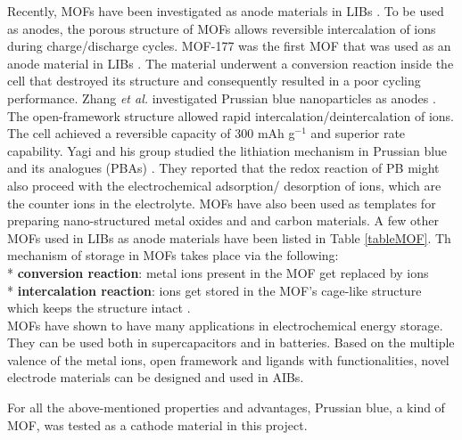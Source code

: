 Recently, MOFs have been investigated as anode materials in LIBs \cite{li_shape-controlled_2006,han_synthesis_2012,zhao_metalorganic_2015}. To be used as anodes, the porous structure of MOFs allows reversible intercalation of  ions during charge/discharge cycles. MOF-177 was the first MOF that was used as an anode material in LIBs \cite{}. The material underwent a conversion reaction inside the cell that destroyed its structure and consequently resulted in a poor cycling performance.  Zhang \textit{et al.} investigated Prussian blue nanoparticles as anodes \cite{nie}. The open-framework structure allowed rapid intercalation/deintercalation of  ions. The cell achieved a reversible capacity of 300 mAh g$^{-1}$ and superior rate capability. Yagi and his group studied the lithiation mechanism in Prussian blue and its analogues (PBAs) \cite{yagi}. They reported that the redox reaction of PB might also proceed with the electrochemical adsorption/ desorption of  ions, which are the counter ions in the electrolyte. MOFs have also been used as templates for preparing nano-structured metal oxides and and carbon materials. A few other MOFs used in LIBs as anode materials have been listed in Table \ref{tableMOF}. Th mechanism of  storage in MOFs takes place via the following: \\*
\textbf{conversion reaction}: metal ions present in the MOF get replaced by  ions \\*
\textbf{intercalation reaction}:  ions get stored in the MOF's cage-like structure which keeps the structure intact \cite{wang_metalorganic_2016}. \\
MOFs have shown to have many applications in electrochemical energy storage. They can be used both in supercapacitors and in batteries. Based on the multiple valence of the metal ions, open framework and ligands with functionalities, novel electrode materials can be designed and used in AIBs. 

For all the above-mentioned properties and advantages, Prussian blue, a kind of MOF, was tested as a cathode material in this project. 


